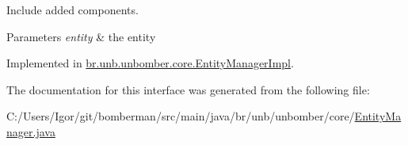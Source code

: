 Include added components. 


\begin{DoxyParams}{Parameters}
{\em entity} & the entity \\
\hline
\end{DoxyParams}


Implemented in \hyperlink{classbr_1_1unb_1_1unbomber_1_1core_1_1_entity_manager_impl_ace0c01af2f4852963c5f7b1c76b0bd88}{br.\+unb.\+unbomber.\+core.\+Entity\+Manager\+Impl}.



The documentation for this interface was generated from the following file\+:\begin{DoxyCompactItemize}
\item 
C\+:/\+Users/\+Igor/git/bomberman/src/main/java/br/unb/unbomber/core/\hyperlink{_entity_manager_8java}{Entity\+Manager.\+java}\end{DoxyCompactItemize}
